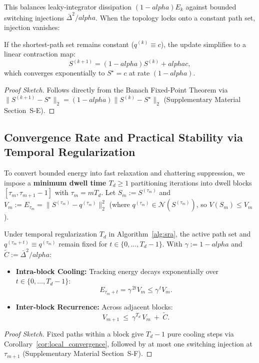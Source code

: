 \documentclass{ccjnl}
\newcommand{\rev}[1]{{\color{blue}#1}}
\def\rev#1{#1}%
\def\alpha{alpha}%
\begin{document}
This balances leaky-integrator dissipation $(1-\alpha)E_k$ against bounded switching injections $\bar{\Delta}^2/\alpha$. When the topology locks onto a constant path set, injection vanishes:

\begin{corollary}
\label{cor:local_convergence}
If the shortest-path set remains constant ($q^{(k)} \equiv c$), the update simplifies to a linear contraction map:
\begin{equation}\label{eq:linear_update}
S^{(k+1)}=(1-\alpha)S^{(k)}+\alpha c,
\end{equation}
which converges exponentially to $S^\star=c$ at rate $(1-\alpha)$.
\end{corollary}
\begin{proof}[Proof Sketch]
Follows directly from the Banach Fixed-Point Theorem via $\|S^{(k+1)}-S^\star\|_2 = (1-\alpha)\|S^{(k)}-S^\star\|_2$ (Supplementary Material Section~S-E).
\end{proof}

\subsection{Convergence Rate and Practical Stability via Temporal Regularization}
\label{subsec:practical_stability_rate}

To convert bounded energy into fast relaxation and chattering suppression, we impose a \textbf{minimum dwell time $T_d \ge 1$} partitioning iterations into dwell blocks $[\tau_m, \tau_{m+1}-1]$ with $\tau_m = m T_d$.
\rev{Let $S_m := S^{(\tau_m)}$ and $V_m := E_{\tau_m} = \|S^{(\tau_m)} - q^{(\tau_m)}\|_2^2$ (where $q^{(\tau_m)} \in \mathcal{N}(S^{(\tau_m)})$, so $V(S_m) \le V_m$).}

\begin{proposition}
\label{prop:block_dynamics}
Under temporal regularization $T_d$ in Algorithm~\ref{alg:sra}, the active path set and $q^{(\tau_m+t)} \equiv q^{(\tau_m)}$ remain fixed for $t \in \{0, \dots, T_d-1\}$. With $\gamma:=1-\alpha$ and $\tilde C:=\bar\Delta^2/\alpha$:
\begin{itemize}
    \item[\textit{(i)}] \textbf{Intra-block Cooling:} Tracking energy decays exponentially over $t \in \{0, \dots, T_d-1\}$:
    \begin{equation}\label{eq:intra_block}
    \rev{E_{\tau_m+t} = \gamma^{\,2t}V_m \le \gamma^{\,t}V_m.}
    \end{equation}
    \item[\textit{(ii)}] \textbf{Inter-block Recurrence:} Across adjacent blocks:
    \begin{equation}\label{eq:inter_block}
    V_{m+1}\ \le\ \gamma^{T_d}\,V_m\ +\ \tilde C.
    \end{equation}
\end{itemize}
\end{proposition}
\begin{proof}[Proof Sketch]
Fixed paths within a block give $T_d-1$ pure cooling steps via Corollary~\ref{cor:local_convergence}, followed by at most one switching injection at $\tau_{m+1}$ (Supplementary Material Section~S-F).
\end{proof}
\end{document}
